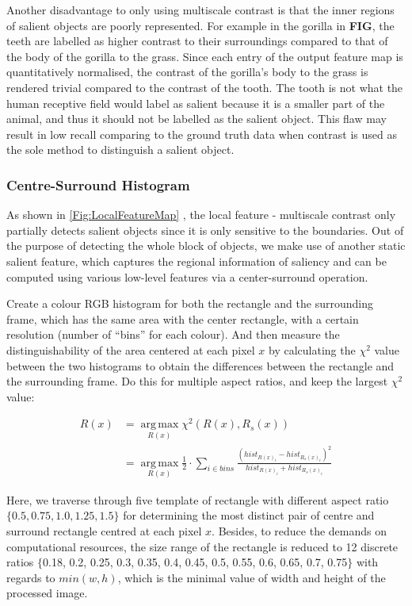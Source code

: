 \documentclass[10pt,twocolumn,letterpaper]{article}
\DeclareMathOperator*{\argmax}{arg\,max}
\newcommand{\SUM}{\sum\limits}
\newcommand{\BOLD}{\textbf}
\begin{document}
Another disadvantage to only using multiscale contrast is that the inner regions of salient objects are poorly represented.  For example in the gorilla in \BOLD{FIG}, the teeth are labelled as higher contrast to their surroundings compared to that of the body of the gorilla to the grass. Since each entry of the output feature map is quantitatively normalised, the contrast of the gorilla's body to the grass is rendered trivial compared to the contrast of the tooth. The tooth is not what the human receptive field would label as salient because it is a smaller part of the animal, and thus it should not be labelled as the salient object. This flaw may result in low recall comparing to the ground truth data when contrast is used as the sole method to distinguish a salient object.

\subsubsection{Centre-Surround Histogram}

As shown in \ref{Fig:LocalFeatureMap} , the local feature - multiscale contrast only partially detects salient objects since it is only sensitive to the boundaries. Out of the purpose of detecting the whole block of objects, we make use of another static salient feature, which captures the regional information of saliency and can be computed using various low-level features via a center-surround operation. 

Create a colour RGB histogram for both the rectangle and the surrounding frame, which has the same area with the center rectangle, with a certain resolution (number of ``bins'' for each colour). And then measure the distinguishability of the area centered at each pixel $x$ by calculating the $\chi^2$ value between the two histograms to obtain the differences between the rectangle and the surrounding frame.  Do this for multiple aspect ratios, and keep the largest $\chi^2$ value: 

\begin{align*}
R(x) &= \argmax\limits_{R(x)}\chi^2(R(x), R_s(x)) \\ &=\argmax\limits_{R(x)}\frac{1}{2}\cdot\SUM_{i\in bins}\frac{(hist_{R(x)_i}-hist_{R_s(x)_i})^2}{hist_{R(x)_i}+hist_{R_s(x)_i}}
\end{align*}

Here, we traverse through five template of rectangle with different aspect ratio $\{ 0.5, 0.75, 1.0, 1.25, 1.5\}$ for determining the most distinct pair of centre and surround rectangle centred at each pixel $x$. Besides, to reduce the demands on computational resources, the size range of the rectangle is reduced to 12 discrete ratios $\{$0.18, 0.2, 0.25, 0.3, 0.35, 0.4, 0.45, 0.5, 0.55, 0.6, 0.65, 0.7, 0.75$\}$ with regards to  $min(w,h)$, which is the minimal value of width and height of the processed image.
\end{document}
